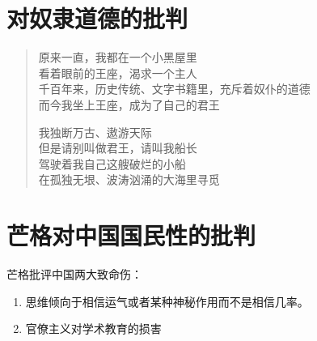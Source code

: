 \documentclass[12pt,oneside]{book}
\newenvironment{shici}{
\begin{verse}
\centering\large\hspace{12pt}}
{\end{verse}}
\begin{document}
\chapter{对奴隶道德的批判}
\begin{shici}
原来一直，我都在一个小黑屋里\\
看着眼前的王座，渴求一个主人\\
千百年来，历史传统、文字书籍里，充斥着奴仆的道德\\
而今我坐上王座，成为了自己的君王 

我独断万古、遨游天际\\
但是请别叫做君王，请叫我船长\\
驾驶着我自己这艘破烂的小船\\
在孤独无垠、波涛汹涌的大海里寻觅 
\end{shici}

\chapter{芒格对中国国民性的批判}
芒格批评中国两大致命伤：

\begin{enumerate}
\item 思维倾向于相信运气或者某种神秘作用而不是相信几率。
\item 官僚主义对学术教育的损害
\end{enumerate}
\end{document}
